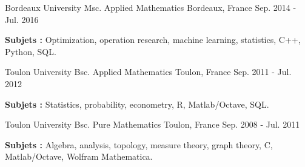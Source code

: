 

\begin{cventries}

\cventry
    {Bordeaux University} %
    {Msc. Applied Mathematics} %
    {Bordeaux, France} %
    {Sep. 2014 - Jul. 2016} %
    {
    \begin{cvitems} %
        \item {\textbf{Subjets :} Optimization, operation research, machine learning, statistics, C++, Python, SQL.}
    \end{cvitems}
    }


\cventry
    {Toulon University} %
    {Bsc. Applied Mathematics} %
    {Toulon, France} %
    {Sep. 2011 - Jul. 2012} %
    {
    \begin{cvitems} %
        \item {\textbf{Subjets :} Statistics, probability, econometry, R, Matlab/Octave, SQL.}
    \end{cvitems}
    }


\cventry
    {Toulon University} %
    {Bsc. Pure Mathematics} %
    {Toulon, France} %
    {Sep. 2008 - Jul. 2011} %
    {
    \begin{cvitems} %
        \item {\textbf{Subjets :} Algebra, analysis, topology, measure theory, graph theory, C, Matlab/Octave, Wolfram Mathematica.}
    \end{cvitems}
    }



\end{cventries}
